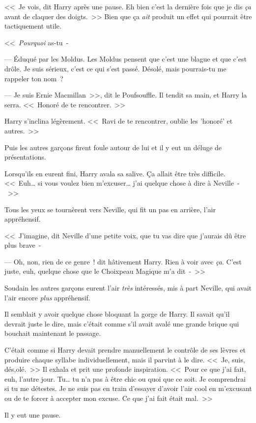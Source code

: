 <<~Je vois, dit Harry après une pause. Eh bien c'est la dernière fois que je dis \emph{ça} avant de claquer des doigts.~>> Bien que ça \emph{ait} produit un effet qui pourrait être tactiquement utile.

<<~\emph{Pourquoi} as-tu~-

--- Éduqué par les Moldus. Les Moldus pensent que c'est une blague et que c'est drôle. Je suis sérieux, c'est ce qui s'est passé. Désolé, mais pourrais-tu me rappeler ton nom~?

--- Je suis Ernie Macmillan~>>, dit le Poufsouffle. Il tendit sa main, et Harry la serra. <<~Honoré de te rencontrer.~>>

Harry s'inclina légèrement. <<~Ravi de te rencontrer, oublie les 'honoré' et autres.~>>

Puis les autres garçons firent foule autour de lui et il y eut un déluge de présentations.

Lorsqu'ils en eurent fini, Harry avala sa salive. Ça allait être très difficile. <<~Euh… si vous voulez bien m'excuser… j'ai quelque chose à dire à Neville~-~>>

Tous les yeux se tournèrent vers Neville, qui fit un pas en arrière, l'air appréhensif.

<<~J'imagine, dit Neville d'une petite voix, que tu vas dire que j'aurais dû être plus brave~-

--- Oh, non, rien de ce genre~! dit hâtivement Harry. Rien à voir avec \emph{ça}. C'est juste, euh, quelque chose que le Choixpeau Magique m'a dit~-~>>

Soudain les autres garçons eurent l'air \emph{très} intéressés, mis à part Neville, qui avait l'air encore \emph{plus} appréhensif.

Il semblait y avoir quelque chose bloquant la gorge de Harry. Il savait qu'il devrait juste le dire, mais c'était comme s'il avait avalé une grande brique qui bouchait maintenant le passage.

C'était comme si Harry devait prendre manuellement le contrôle de ses lèvres et produire chaque syllabe individuellement, mais il parvint à le dire. <<~Je, suis, dés,olé.~>> Il exhala et prit une profonde inspiration. <<~Pour ce que j'ai fait, euh, l'autre jour. Tu… tu n'a pas à être chic ou quoi que ce soit. Je comprendrai si tu me détestes. Je ne suis pas en train d'essayer d'avoir l'air cool en m'excusant ou de te forcer à accepter mon excuse. Ce que j'ai fait était mal.~>>

Il y eut une pause.

